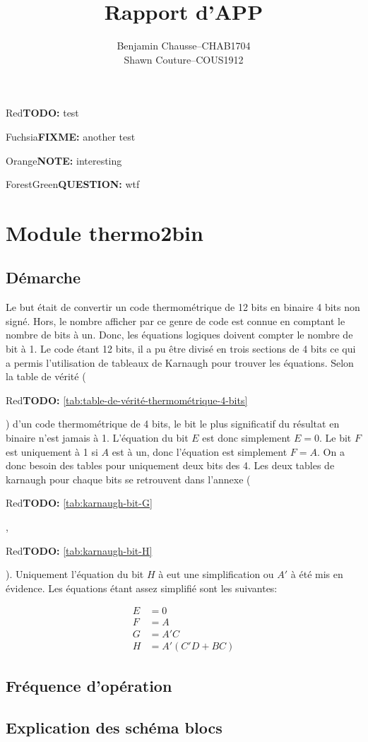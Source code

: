 \documentclass[a11paper]{article}
\title{Rapport d'APP}
\author{
  \addtolength{\tabcolsep}{-0.4em}
  \begin{tabular}{rcl} %
      Benjamin Chausse & -- & CHAB1704 \\
      Shawn Couture    & -- & COUS1912 \\
  \end{tabular}
}
\newcommand{\todo}[1]{\begin{color}{Red}\textbf{TODO:} #1\end{color}}
\newcommand{\note}[1]{\begin{color}{Orange}\textbf{NOTE:} #1\end{color}}
\newcommand{\fixme}[1]{\begin{color}{Fuchsia}\textbf{FIXME:} #1\end{color}}
\newcommand{\question}[1]{\begin{color}{ForestGreen}\textbf{QUESTION:} #1\end{color}}
\begin{document}
\maketitle
\newpage
\tableofcontents
\newpage

\todo{test} \fixme{another test} \note{interesting} \question{wtf}

\section{Module thermo2bin}

\subsection{Démarche}
Le but était de convertir un code thermométrique de 12 bits en binaire 4 bits non signé. Hors, le nombre afficher par ce genre de code
est connue en comptant le nombre de bits à un. Donc, les équations logiques doivent compter le nombre de bit à 1. Le code étant 12 bits,
il a pu être divisé en trois sections de 4 bits ce qui a permis l'utilisation de tableaux de Karnaugh pour trouver les équations. Selon
la table de vérité (\todo{\ref{tab:table-de-vérité-thermométrique-4-bits}}) d'un code thermométrique de 4 bits, le bit le plus significatif
du résultat en binaire n'est jamais à 1. L'équation du bit $E$ est donc simplement $E=0$. Le bit $F$ est uniquement à 1 si $A$ est à un, donc
l'équation est simplement $F=A$. On a donc besoin des tables pour uniquement deux bits des 4. Les deux tables de karnaugh pour chaque bits
se retrouvent dans l'annexe (\todo{\ref{tab:karnaugh-bit-G}}, \todo{\ref{tab:karnaugh-bit-H}}). Uniquement l'équation du bit $H$ à eut une
simplification ou $A'$ à été mis en évidence. Les équations étant assez simplifié sont les suivantes:

\begin{align}
  E &= 0 \\ F &= A \\ G &= A'C \\ H &= A'(C'D+BC)
\end{align}

\subsection{Fréquence d'opération}

\subsection{Explication des schéma blocs}
\end{document}
